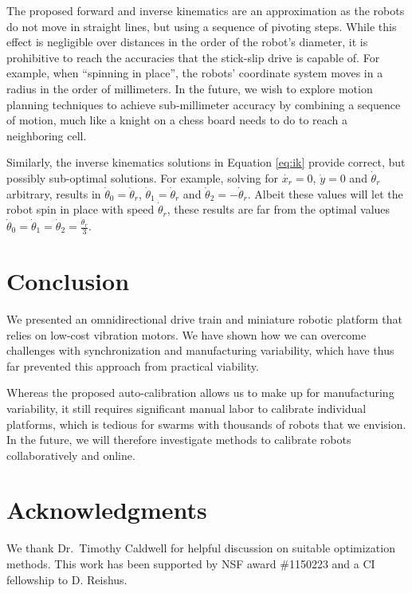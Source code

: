 \documentclass[letterpaper, 10pt, conference]{ieeeconf}
\begin{document}
The proposed forward and inverse kinematics are an approximation as the robots do not move in straight lines, but using a sequence of pivoting steps. While this effect is negligible over distances in the order of the robot's diameter, it is prohibitive to reach the accuracies that the stick-slip drive is capable of. For example, when ``spinning in place'', the robots' coordinate system moves in a radius in the order of millimeters. In the future, we wish to explore motion planning techniques to achieve sub-millimeter accuracy by combining a sequence of motion, much like a knight on a chess board needs to do to reach a neighboring cell. 

Similarly, the inverse kinematics solutions in Equation \ref{eq:ik} provide correct, but possibly sub-optimal solutions. For example, solving for $\dot{x_r}=0$, $\dot{y}=0$ and $\dot{\theta}_r$ arbitrary, results in $\dot{\theta}_0=\dot{\theta}_r$, $\dot{\theta}_1=\dot{\theta}_r$ and $\dot{\theta}_2=-\dot{\theta}_r$. Albeit these values will let the robot spin in place with speed $\dot{\theta}_r$, these results are far from the optimal values $\dot{\theta}_0=\dot{\theta}_1=\dot{\theta}_2=\frac{\dot{\theta}_r}{3}$. 

\section{Conclusion}
We presented an omnidirectional drive train and miniature robotic platform that relies on low-cost vibration motors. We have shown how we can overcome challenges with synchronization and manufacturing variability, which have thus far prevented this approach from practical viability. 

Whereas the proposed auto-calibration allows us to make up for manufacturing variability, it still requires significant manual labor to calibrate individual platforms, which is tedious for swarms with thousands of robots that we envision. In the future, we will therefore investigate methods to calibrate robots collaboratively and online.  

\section*{Acknowledgments} We thank Dr.\ Timothy Caldwell for helpful discussion on suitable optimization methods. 
This work has been supported by NSF award \#1150223 and a CI fellowship to D. Reishus.




\end{document}
